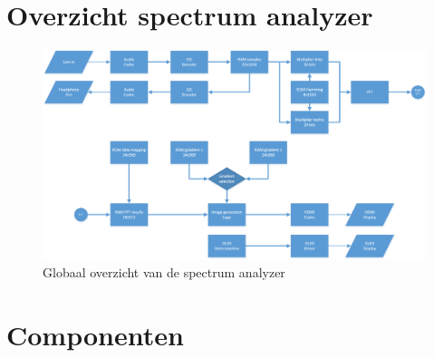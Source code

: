 \chapter{Overzicht spectrum analyzer}
\label{sec:appMapping}
	\begin{figure}[H]
		\centering
		\includegraphics[width=0.75\textheight, angle=270]{Appendix/FlowCharts/Global}
		\caption{Globaal overzicht van de spectrum analyzer}
		\label{fig:FlowChartMapping}
	\end{figure}

\chapter{Componenten}
